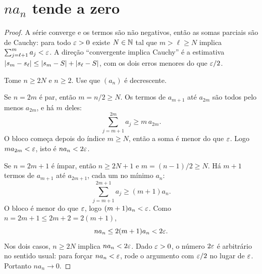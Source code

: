 \documentclass[11pt,a4paper]{article}
\begin{document}
\section{\(n a_n\) tende a zero}

\begin{proof}
A série converge e os termos são não negativos, então as somas parciais são de Cauchy: para todo \(\varepsilon>0\) existe \(N\in\mathbb{N}\) tal que \(m>\ell\ge N\) implica \(\sum_{j=\ell+1}^{m} a_j<\varepsilon\). A direção ``convergente implica Cauchy'' é a estimativa \(\left\lvert s_m-s_\ell \right\rvert\le\left\lvert s_m-S \right\rvert+\left\lvert s_\ell-S \right\rvert\), com os dois erros menores do que \(\varepsilon/2\).

Tome \(n\ge 2N\) e \(n\ge 2\). Use que \((a_n)\) é decrescente.

Se \(n=2m\) é par, então \(m=n/2\ge N\). Os termos de \(a_{m+1}\) até \(a_{2m}\) são todos pelo menos \(a_{2m}\), e há \(m\) deles:
\[
\sum_{j=m+1}^{2m} a_j\ge m\, a_{2m}.
\]
O bloco começa depois do índice \(m\ge N\), então a soma é menor do que \(\varepsilon\). Logo \(m a_{2m}<\varepsilon\), isto é \(n a_n<2\varepsilon\).

Se \(n=2m+1\) é ímpar, então \(n\ge 2N+1\) e \(m=(n-1)/2\ge N\). Há \(m+1\) termos de \(a_{m+1}\) até \(a_{2m+1}\), cada um no mínimo \(a_n\):
\[
\sum_{j=m+1}^{2m+1} a_j\ge (m+1)a_n.
\]
O bloco é menor do que \(\varepsilon\), logo \((m+1)a_n<\varepsilon\). Como \(n=2m+1\le 2m+2=2(m+1)\),
\[
n a_n\le 2(m+1)a_n<2\varepsilon.
\]
Nos dois casos, \(n\ge 2N\) implica \(n a_n<2\varepsilon\). Dado \(\varepsilon>0\), o número \(2\varepsilon\) é arbitrário no sentido usual: para forçar \(n a_n<\varepsilon\), rode o argumento com \(\varepsilon/2\) no lugar de \(\varepsilon\). Portanto \(n a_n\to 0\).
\end{proof}
\end{document}
